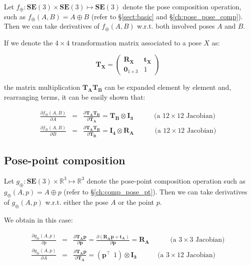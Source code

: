 \documentclass[a4paper,11pt]{report}
\begin{document}
Let $f_\oplus: \mathbf{SE}(3) \times \mathbf{SE}(3) \mapsto \mathbf{SE}(3)$ denote
the pose composition operation,
such as $f_\oplus(A,B) = A \oplus B$
(refer to \S\ref{sect:basic} and \S\ref{ch:pose_pose_comp}).
Then we can take derivatives of $f_\oplus(A,B)$ w.r.t. both involved poses $A$ and $B$.

If we denote the $4 \times 4$ transformation matrix associated to a pose $X$ as:

\begin{equation}
 \mathbf{T_X} =
\left(
\begin{array}{c|c}
  \mathbf{R_X} & \mathbf{t_X} \\
\hline
  \mathbf{0}_{1\times 3} & 1
\end{array}
\right)
\end{equation}

\noindent the matrix multiplication $\mathbf{T_A}\mathbf{T_B}$ can be
expanded element by element and, rearranging terms, it can be easily shown that:

\begin{eqnarray}
\label{eq:oplus.ab.wrt.a}
\frac{\partial f_\oplus(A,B) }{\partial A } &=&
\frac{\partial \mathbf{T_A}\mathbf{T_B} }{\partial \mathbf{T_A} } = \mathbf{T_B} \otimes \mathbf{I_3}
\quad \quad \quad
\text{(a $12 \times 12$ Jacobian)}
\\
\label{eq:oplus.ab.wrt.b}
\frac{\partial f_\oplus(A,B) }{\partial B } &=&
\frac{\partial \mathbf{T_A}\mathbf{T_B} }{\partial \mathbf{T_B} } =
\mathbf{I_4} \otimes   \mathbf{R_A}
\quad \quad \quad
\text{(a $12 \times 12$ Jacobian)}
\end{eqnarray}


\subsection{Pose-point composition}

Let $g_\oplus: \mathbf{SE}(3) \times \mathbb{R}^3 \mapsto \mathbb{R}^3$ denote
the pose-point composition operation
such as $g_\oplus(A,p) = A \oplus p$
(refer to \S\ref{ch:comp_pose_pt}).
Then we can take derivatives of $g_\oplus(A,p)$ w.r.t. either the pose $A$ or the point $p$.

We obtain in this case:

\begin{eqnarray}
\label{eq:jac_dAp_p}
\frac{\partial g_\oplus(A,p) }{\partial p } &=&
\frac{\partial \mathbf{T_A}\mathbf{p} }{\partial \mathbf{p} } =
\frac{\partial (\mathbf{R_A}\mathbf{p} + \mathbf{t_A})}{\partial \mathbf{p} } =
\mathbf{R_A}
\quad \quad \quad
\text{(a $3 \times 3$ Jacobian)}
\\
\label{eq:jac_dAp_A}
\frac{\partial g_\oplus(A,p) }{\partial A } &=&
\frac{\partial \mathbf{T_A}\mathbf{p} }{\partial \mathbf{T_A} } =
\left( \mathbf{p}^\top ~~ 1 \right) \otimes \mathbf{I_3}
\quad \quad \quad
\text{(a $3 \times 12$ Jacobian)}
\end{eqnarray}
\end{document}
